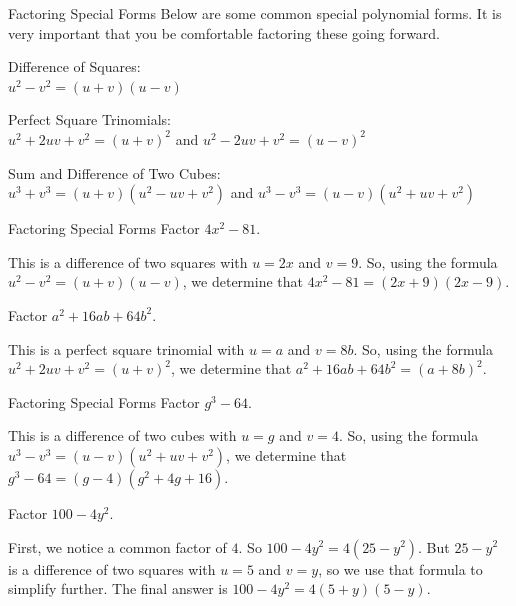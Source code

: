 \documentclass{beamer}
\newcommand{\fp}[1]{\left({#1}\right)} %
\begin{document}
\begin{frame}[t]{Factoring Special Forms}
Below are some common special polynomial forms. It is very important that you be comfortable factoring these going forward.

\pause

Difference of Squares: \\
$u^2 - v^2 = (u+v)(u-v)$

\pause

Perfect Square Trinomials: \\
$u^2 + 2uv + v^2 = (u + v)^2$ and $u^2 - 2uv + v^2 = (u - v)^2$

\pause

Sum and Difference of Two Cubes: \\
$u^3 + v^3 = (u+v)\fp{u^2 - uv + v^2}$ and $u^3 - v^3 = (u - v)\fp{u^2 + uv + v^2}$
\end{frame}

\begin{frame}[t]{Factoring Special Forms}
Factor $4x^2 - 81$.

\pause

This is a difference of two squares with $u = 2x$ and $v = 9$. \pause So, using the formula $u^2 - v^2 = (u + v)(u - v)$, we determine that \pause $4x^2 - 81 = (2x + 9)(2x - 9)$. \vspace{12pt}

\pause

Factor $a^2 + 16ab + 64b^2$.

\pause

This is a perfect square trinomial with $u = a$ and $v = 8b$. \pause So, using the formula $u^2 + 2uv + v^2 = (u + v)^2$, we determine that \pause $a^2 + 16ab + 64b^2 = (a + 8b)^2$.
\end{frame}

\begin{frame}[t]{Factoring Special Forms}
Factor $g^3 - 64$.

\pause

This is a difference of two cubes with $u = g$ and $v = 4$. \pause So, using the formula $u^3 - v^3 = (u - v)\fp{u^2 + uv + v^2}$, we determine that \pause $g^3 - 64 = (g - 4)\fp{g^2 + 4g + 16}$. \vspace{12pt}

\pause

Factor $100 - 4y^2$.

\pause

First, we notice a common factor of $4$. \pause So $100 - 4y^2 = 4\fp{25 - y^2}$. But $25 - y^2$ is a difference of two squares with $u = 5$ and $v = y$, so we use that formula to simplify further. \pause The final answer is $100 - 4y^2 = 4(5 + y)(5 - y)$.
\end{frame}
\end{document}
